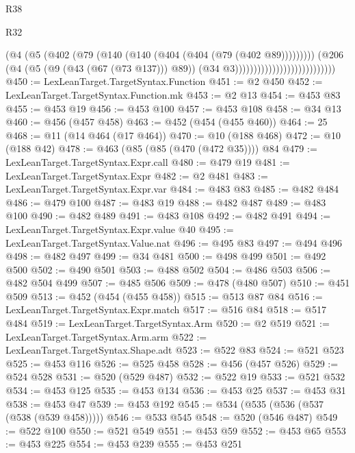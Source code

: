 \begin{lexlean}{R38}
\begin{lexlean}{R32}
\begin{coremodule}
{{{{{{{{{{{{{{{{{{{{{{{{{{{{{{{{{{{{{{{{{{{{{{{{{{{                                                  (@4
                                                    (@5
                                                      (@402
                                                        (@79
                                                          (@140
                                                            (@140
                                                              (@404 (@404 (@79 (@402 @89)))))))))
                                                    (@206
                                                      (@4
                                                        (@5 (@9 (@43 (@67 (@73 @137))) @89))
                                                        (@34 @3)))))))))))))))))))))))))))
@450 := LexLeanTarget.TargetSyntax.Function
@451 := @2 @450
@452 := LexLeanTarget.TargetSyntax.Function.mk
@453 := @2 @13
@454 := @453 @83
@455 := @453 @19
@456 := @453 @100
@457 := @453 @108
@458 := @34 @13
@460 := @456 (@457 @458)
@463 := @452 (@454 (@455 @460))
@464 := 25
@468 := @11 (@14 @464 (@17 @464))
@470 := @10 (@188 @468)
@472 := @10 (@188 @42)
@478 := @463 (@85 (@85 (@470 (@472 @35)))) @84
@479 := LexLeanTarget.TargetSyntax.Expr.call
@480 := @479 @19
@481 := LexLeanTarget.TargetSyntax.Expr
@482 := @2 @481
@483 := LexLeanTarget.TargetSyntax.Expr.var
@484 := @483 @83
@485 := @482 @484
@486 := @479 @100
@487 := @483 @19
@488 := @482 @487
@489 := @483 @100
@490 := @482 @489
@491 := @483 @108
@492 := @482 @491
@494 := LexLeanTarget.TargetSyntax.Expr.value @40
@495 := LexLeanTarget.TargetSyntax.Value.nat
@496 := @495 @83
@497 := @494 @496
@498 := @482 @497
@499 := @34 @481
@500 := @498 @499
@501 := @492 @500
@502 := @490 @501
@503 := @488 @502
@504 := @486 @503
@506 := @482 @504 @499
@507 := @485 @506
@509 := @478 (@480 @507)
@510 := @451 @509
@513 := @452 (@454 (@455 @458))
@515 := @513 @87 @84
@516 := LexLeanTarget.TargetSyntax.Expr.match
@517 := @516 @84
@518 := @517 @484
@519 := LexLeanTarget.TargetSyntax.Arm
@520 := @2 @519
@521 := LexLeanTarget.TargetSyntax.Arm.arm
@522 := LexLeanTarget.TargetSyntax.Shape.adt
@523 := @522 @83
@524 := @521 @523
@525 := @453 @116
@526 := @525 @458
@528 := @456 (@457 @526)
@529 := @524 @528
@531 := @520 (@529 @487)
@532 := @522 @19
@533 := @521 @532
@534 := @453 @125
@535 := @453 @134
@536 := @453 @25
@537 := @453 @31
@538 := @453 @47
@539 := @453 @192
@545 := @534 (@535 (@536 (@537 (@538 (@539 @458)))))
@546 := @533 @545
@548 := @520 (@546 @487)
@549 := @522 @100
@550 := @521 @549
@551 := @453 @59
@552 := @453 @65
@553 := @453 @225
@554 := @453 @239
@555 := @453 @251
}}}}}}}}}}}}}}}}}}}}}}}}}}}}}}}}}}}}}}}}}}}}}}}}}}}
\end{coremodule}
\end{lexlean}
\end{lexlean}
